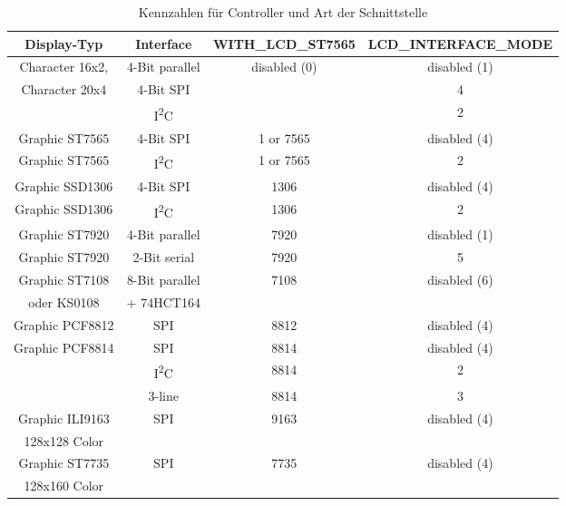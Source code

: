\begin{description}
\begin{table}[H]
  \begin{center}
    \begin{tabular}{| c | c | c | c|}
    \hline
 Display-Typ        &  Interface     & WITH\_LCD\_ST7565 &  LCD\_INTERFACE\_MODE \\
    \hline
    \hline
  Character 16x2,   & 4-Bit parallel &  disabled (0)      & disabled (1) \\
  Character 20x4    &  4-Bit SPI     &                    &    4   \\
                  & I\textsuperscript{2}C &               &    2   \\
    \hline
  Graphic ST7565    & 4-Bit SPI      & 1 or 7565          & disabled (4) \\
    \hline
  Graphic ST7565  & I\textsuperscript{2}C & 1 or 7565     &   2 \\
    \hline
  Graphic SSD1306   & 4-Bit SPI      & 1306               & disabled (4) \\
    \hline
  Graphic SSD1306 & I\textsuperscript{2}C & 1306          &   2 \\
    \hline
  Graphic ST7920    & 4-Bit parallel  & 7920              & disabled (1) \\
    \hline
  Graphic ST7920    & 2-Bit serial    & 7920               &  5 \\
    \hline
  Graphic ST7108    & 8-Bit parallel  & 7108              & disabled (6) \\
  oder KS0108       &    + 74HCT164   &                   &      \\
    \hline
  Graphic PCF8812   & SPI             & 8812              & disabled (4) \\
    \hline
  Graphic PCF8814   & SPI             & 8814              & disabled (4) \\
                  & I\textsuperscript{2}C & 8814          &   2 \\
                    & 3-line          & 8814              &   3 \\
    \hline
  Graphic ILI9163   & SPI             & 9163              & disabled (4) \\
  128x128 Color     &                 &                   &              \\
    \hline
  Graphic ST7735    & SPI             & 7735              & disabled (4) \\
  128x160 Color     &                 &                   &              \\
    \hline
    \end{tabular}
  \end{center}
  \caption{Kennzahlen für Controller und  Art der Schnittstelle}
  \label{tab:cod-display}
\end{table}


\end{description}
